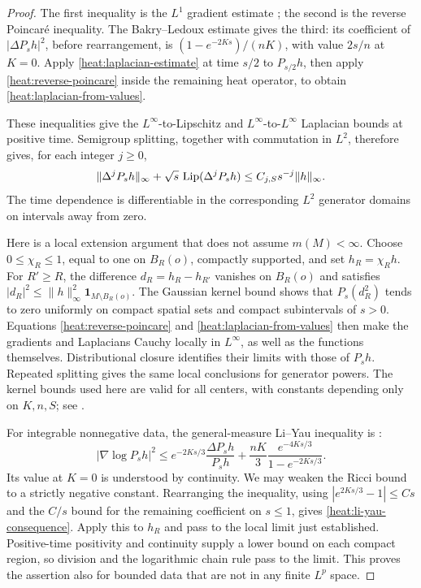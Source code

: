 \begin{proof}
The first inequality is the \(L^1\) gradient estimate
\cite[Corollary~3.5]{Savare2014}; the second is the reverse
Poincar\'e inequality. The Bakry--Ledoux estimate
\cite[Proposition~4.9]{ErbarKuwadaSturm2015} gives the third:
its coefficient of \(|\Delta P_sh|^2\), before rearrangement,
is \((1-e^{-2Ks})/(nK)\), with value \(2s/n\) at \(K=0\).
Apply \eqref{heat:laplacian-estimate} at time \(s/2\) to
\(P_{s/2}h\), then apply \eqref{heat:reverse-poincare} inside
the remaining heat operator, to obtain
\eqref{heat:laplacian-from-values}.

These inequalities give the \(L^\infty\)-to-Lipschitz and
\(L^\infty\)-to-\(L^\infty\) Laplacian bounds at positive time.
Semigroup splitting, together with commutation in \(L^2\),
therefore gives, for each integer \(j\ge0\),
\[
\|\Delta^jP_sh\|_\infty
+\sqrt{s}\,\operatorname{Lip}(\Delta^jP_sh)
\le C_{j,S}s^{-j}\|h\|_\infty.
\]
The time dependence is differentiable in the corresponding
\(L^2\) generator domains on intervals away from zero.

Here is a local extension argument that does not assume
\(m(M)<\infty\). Choose \(0\le\chi_R\le1\), equal to one on
\(B_R(o)\), compactly supported, and set \(h_R=\chi_Rh\).
For \(R'\ge R\), the difference \(d_R=h_R-h_{R'}\) vanishes
on \(B_R(o)\) and satisfies
\(|d_R|^2\le\|h\|_\infty^2\mathbf1_{M\setminus B_R(o)}\).
The Gaussian kernel bound shows that \(P_s(d_R^2)\) tends to
zero uniformly on compact spatial sets and compact subintervals
of \(s>0\). Equations
\eqref{heat:reverse-poincare} and
\eqref{heat:laplacian-from-values} then make the gradients and
Laplacians Cauchy locally in \(L^\infty\), as well as the
functions themselves. Distributional closure identifies their
limits with those of \(P_sh\). Repeated splitting gives the
same local conclusions for generator powers. The kernel bounds
used here are valid for all centers, with constants depending
only on \(K,n,S\); see
\cite[Theorem~1.2]{JiangLiZhang2016}.

For integrable nonnegative data, the general-measure Li--Yau
inequality is \cite[Theorem~3.4]{GigliTamanini2021}:
\[
|\nabla\log P_sh|^2
\le e^{-2Ks/3}\frac{\Delta P_sh}{P_sh}
+\frac{nK}{3}\frac{e^{-4Ks/3}}{1-e^{-2Ks/3}}.
\]
Its value at \(K=0\) is understood by continuity. We may weaken
the Ricci bound to a strictly negative constant. Rearranging
the inequality, using \(|e^{2Ks/3}-1|\le Cs\) and the
\(C/s\) bound for the remaining coefficient on \(s\le1\),
gives \eqref{heat:li-yau-consequence}. Apply this to \(h_R\)
and pass to the local limit just established. Positive-time
positivity and continuity supply a lower bound on each compact
region, so division and the logarithmic chain rule pass to the
limit. This proves the assertion also for bounded data that are
not in any finite \(L^p\) space.
\end{proof}
